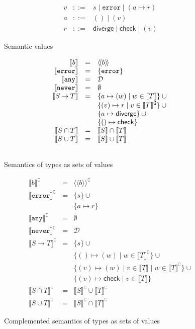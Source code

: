 \documentclass[acmsmall,review,screen]{acmart}
\newcommand{\NEVER}{\mathtt{never}}
\newcommand{\ANY}{\mathtt{any}}
\newcommand{\ERROR}{\mathtt{error}}
\newcommand{\DIVERGE}{\mathsf{diverge}}
\newcommand{\CHECK}{\mathsf{check}}
\newcommand{\fun}{\mathbin{\rightarrow}}
\newcommand{\sem}[1]{\llbracket{#1}\rrbracket}
\newcommand{\ssem}[1]{\langle\!\langle{#1}\rangle\!\rangle}
\newcommand{\nsem}[1]{\llbracket{#1}\rrbracket^\complement}
\newcommand{\nssem}[1]{\ssem{#1}^\complement}
\begin{document}
\begin{figure}
  
\[\begin{array}{rcl}
  v & ::= & s \mid \ERROR \mid (a \mapsto r) \\
  a & ::= & () \mid (v) \\
  r & ::= & \DIVERGE \mid \CHECK \mid (v) 
\end{array}\]
\caption{Semantic values}
\label{fig:semval}

\[\begin{array}{rcl}
  \sem{b} & = & \ssem{b} \\
  \sem{\ERROR} & = & \{ \ERROR \} \\
  \sem{\ANY} & = & \mathcal{D} \\
  \sem{\NEVER} & = & \emptyset \\
  \sem{S \fun T} & = & \{ a \mapsto (w) \mid w \in \sem{T} \} \cup {} \\
                    && \{ (v) \mapsto r \mid v \in \nsem{T} \} \cup {} \\
                    && \{ a \mapsto \DIVERGE \} \cup {} \\
                    && \{ () \mapsto \CHECK \} \\
  \sem{S \cap T} & = & \sem{S} \cap \sem{T} \\
  \sem{S \cup T} & = & \sem{S} \cup \sem{T} \\[\bigskipamount]
\end{array}\]
\caption{Semantics of types as sets of values}
\label{fig:typsem}

\[\begin{array}{rcl}
  \nsem{b} & = & \nssem{b} \\
  \nsem{\ERROR} & = & \{ s \} \cup {} \\
              && \{ a \mapsto r \} \\
  \nsem{\ANY} & = & \emptyset \\
  \nsem{\NEVER} & = & \mathcal{D} \\
  \nsem{S \fun T} & = & \{ s \} \cup {} \\
              && \{ () \mapsto (w) \mid w \in \nsem{T} \} \cup {} \\
              && \{ (v) \mapsto (w) \mid v \in \sem{T} \mid w \in \nsem{T} \} \cup {} \\
              && \{ (v) \mapsto \CHECK \mid v \in \sem{T} \} \\
  \nsem{S \cap T} & = & \nsem{S} \cup \nsem{T} \\
  \nsem{S \cup T} & = & \nsem{S} \cap \nsem{T}
\end{array}\]
\caption{Complemented semantics of types as sets of values}

\end{figure}
\end{document}
